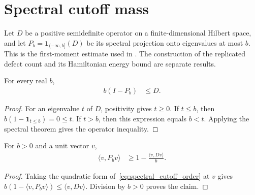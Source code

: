 \section{Spectral cutoff mass}
\label{sec:spectral_cutoff_mass}

Let $D$ be a positive semidefinite operator on a finite-dimensional Hilbert
space, and let $P_b=\mathbf 1_{(-\infty,b]}(D)$ be its spectral projection
onto eigenvalues at most $b$. This is the first-moment estimate used in
\cite[Section~7]{OpenAI2026AreaLaw}.
The construction of the replicated defect count and its Hamiltonian energy
bound are separate results.

\begin{theorem}
\label{thm:spectral_cutoff_order}
\leanok
For every real $b$,
\begin{align}
 b(I-P_b)&\le D.
 \label{eq:spectral_cutoff_order}
\end{align}
\end{theorem}
\begin{proof}
\leanok
For an eigenvalue $t$ of $D$, positivity gives $t\ge0$.
If $t\le b$, then $b(1-\mathbf1_{t\le b})=0\le t$.
If $t>b$, then this expression equals $b<t$.
Applying the spectral theorem gives the operator inequality.
\end{proof}

\begin{theorem}
\label{thm:spectral_cutoff_mass}
\leanok
{}
For $b>0$ and a unit vector $v$,
\begin{align}
 \langle v,P_bv\rangle
 &\ge 1-\frac{\langle v,Dv\rangle}{b}.
 \label{eq:spectral_cutoff_mass}
\end{align}
\end{theorem}
\begin{proof}
\leanok
{}
Taking the quadratic form of~\eqref{eq:spectral_cutoff_order} at $v$ gives
$b(1-\langle v,P_bv\rangle)\le\langle v,Dv\rangle$.
Division by $b>0$ proves the claim.
\end{proof}
